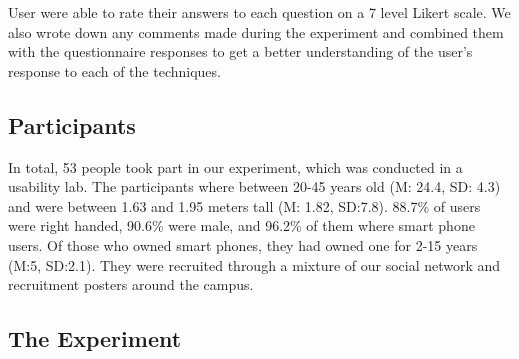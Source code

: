 User were able to rate their answers to each question on a 7 level Likert scale. 
We also wrote down any comments made during the experiment and combined them with the questionnaire responses to get a better understanding of the user’s response to each of the techniques. 

\subsection{Participants}
In total, 53 people took part in our experiment, which was conducted in a usability lab. 
The participants where between 20-45 years old (M: 24.4, SD: 4.3) and were between 1.63 and 1.95 meters tall (M: 1.82, SD:7.8). 
88.7\% of users were right handed, 90.6\% were male, and 96.2\% of them where smart phone users. 
Of those who owned smart phones, they had owned one for 2-15 years (M:5, SD:2.1). 
They were recruited through a mixture of our social network and recruitment posters around the campus. 

\subsection{The Experiment}

